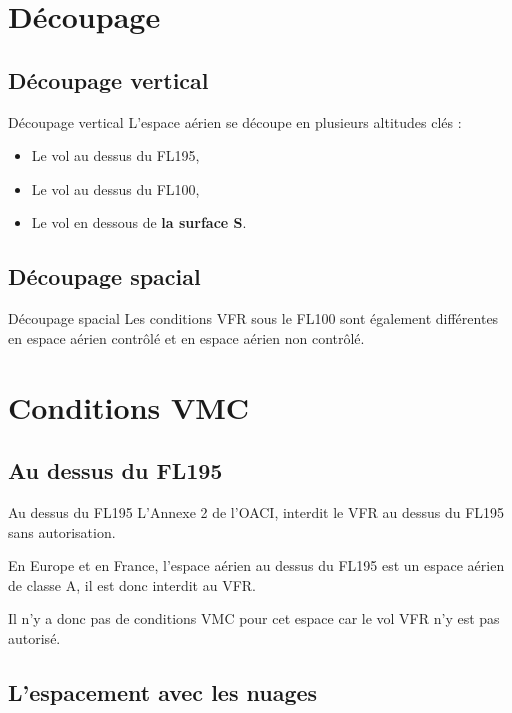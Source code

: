 \documentclass{beamer}
\begin{document}
\section{Découpage}
\subsection{Découpage vertical}

\begin{frame}{Découpage vertical}
  L'espace aérien se découpe en plusieurs altitudes clés :

  \begin{itemize}
    \item Le vol au dessus du FL195, \pause
    \item Le vol au dessus du FL100, \pause
    \item Le vol en dessous de \textbf{la surface S}.
  \end{itemize}

\end{frame}


\subsection{Découpage spacial}
\begin{frame}{Découpage spacial}
  Les conditions VFR sous le FL100 sont également différentes en
  espace aérien contrôlé et en espace aérien non contrôlé.
\end{frame}

\section{Conditions VMC}
\subsection{Au dessus du FL195}

\begin{frame}{Au dessus du FL195}
  L'Annexe 2 de l'OACI, interdit le VFR au dessus du FL195 sans
  autorisation.
  
  En Europe et en France, l'espace aérien au dessus du FL195 est un
  espace aérien de classe A, il est donc interdit au VFR.

  Il n'y a donc pas de conditions VMC pour cet espace car le vol VFR
  n'y est pas autorisé.
\end{frame}

\subsection{L'espacement avec les nuages}
\end{document}
